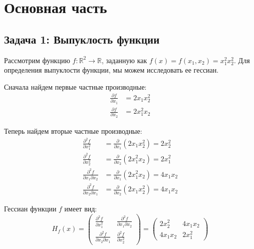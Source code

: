 \documentclass[a4paper,12pt]{article}
\title{}
\author{}
\date{}
\begin{document}
	\maketitle
	
	\section*{Основная часть}


	
	\subsection*{Задача 1: Выпуклость функции}
	
	Рассмотрим функцию $f: \mathbb{R}^2 \rightarrow \mathbb{R}$, заданную как $f(x) = f(x_1, x_2) = x_1^2 x_2^2$. Для определения выпуклости функции, мы можем исследовать ее гессиан.
	
	Сначала найдем первые частные производные:
	\begin{align*}
		\frac{\partial f}{\partial x_1} &= 2x_1 x_2^2 \\
		\frac{\partial f}{\partial x_2} &= 2x_1^2 x_2
	\end{align*}
	
	Теперь найдем вторые частные производные:
	\begin{align*}
		\frac{\partial^2 f}{\partial x_1^2} &= \frac{\partial}{\partial x_1} (2x_1 x_2^2) = 2x_2^2 \\
		\frac{\partial^2 f}{\partial x_2^2} &= \frac{\partial}{\partial x_2} (2x_1^2 x_2) = 2x_1^2 \\
		\frac{\partial^2 f}{\partial x_1 \partial x_2} &= \frac{\partial}{\partial x_1} (2x_1^2 x_2) = 4x_1 x_2 \\
		\frac{\partial^2 f}{\partial x_2 \partial x_1} &= \frac{\partial}{\partial x_2} (2x_1 x_2^2) = 4x_1 x_2
	\end{align*}
	
	Гессиан функции $f$ имеет вид:
	$$
	H_f(x) = \begin{pmatrix}
		\frac{\partial^2 f}{\partial x_1^2} & \frac{\partial^2 f}{\partial x_1 \partial x_2} \\
		\frac{\partial^2 f}{\partial x_2 \partial x_1} & \frac{\partial^2 f}{\partial x_2^2}
	\end{pmatrix} =
	\begin{pmatrix}
		2x_2^2 & 4x_1 x_2 \\
		4x_1 x_2 & 2x_1^2
	\end{pmatrix}
	$$
	
\end{document}
